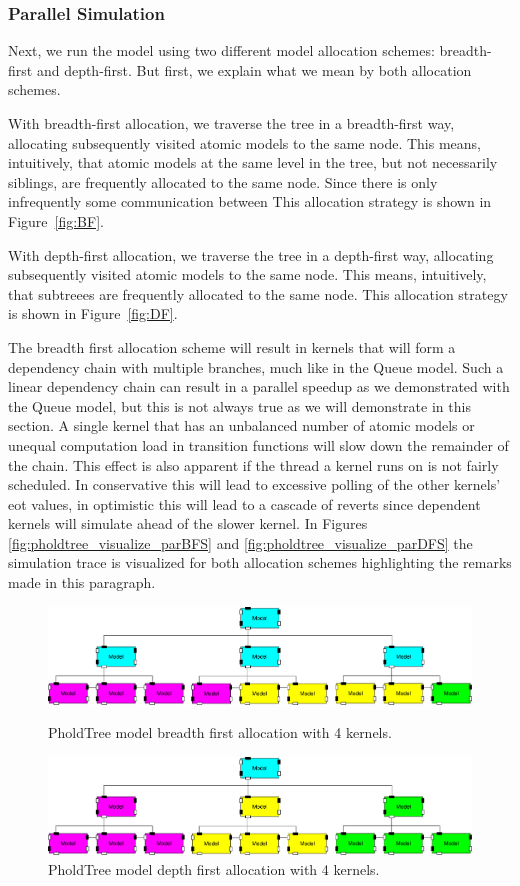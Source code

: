 \subsubsection{Parallel Simulation}
Next, we run the model using two different model allocation schemes: breadth-first and depth-first.
But first, we explain what we mean by both allocation schemes.

With breadth-first allocation, we traverse the tree in a breadth-first way, allocating subsequently visited atomic models to the same node.
This means, intuitively, that atomic models at the same level in the tree, but not necessarily siblings, are frequently allocated to the same node.
Since there is only infrequently some communication between 
This allocation strategy is shown in Figure~\ref{fig:BF}.

With depth-first allocation, we traverse the tree in a depth-first way, allocating subsequently visited atomic models to the same node.
This means, intuitively, that subtreees are frequently allocated to the same node.
This allocation strategy is shown in Figure~\ref{fig:DF}.

The breadth first allocation scheme will result in kernels that will form a dependency chain with multiple branches, much like in the Queue model.
Such a linear dependency chain can result in a parallel speedup as we demonstrated with the Queue model, but this is not always true as we will demonstrate in this section.
A single kernel that has an unbalanced number of atomic models or unequal computation load in transition functions will slow down the remainder of the chain. This effect is also apparent if the thread a kernel runs on is not fairly scheduled. In conservative this will lead to excessive polling of the other kernels' eot values, in optimistic this will lead to a cascade of reverts since dependent kernels will simulate ahead of the slower kernel. In Figures \ref{fig:pholdtree_visualize_parBFS} and \ref{fig:pholdtree_visualize_parDFS} the simulation trace is visualized for both allocation schemes highlighting the remarks made in this paragraph.
\begin{figure}
   \center
   
   \includegraphics[width=\modelfraction\columnwidth]{fig/pholdtree_alloc_BF.pdf}
   \caption{PholdTree model breadth first allocation with 4 kernels.}
   \label{fig:PholdTree_model_bfs}
   \includegraphics[width=\modelfraction\columnwidth]{fig/pholdtree_alloc_DF.pdf}
   \caption{PholdTree model depth first allocation with 4 kernels.}
   \label{fig:PholdTree_model_dfs}
\end{figure}

